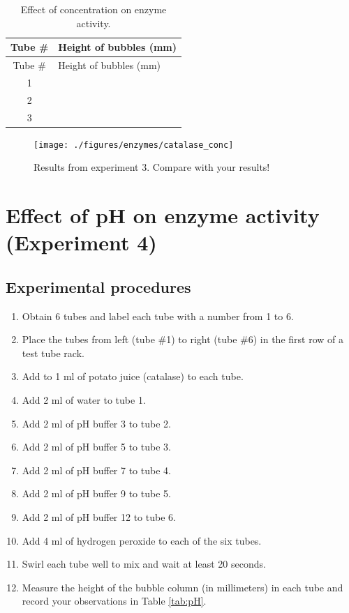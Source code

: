 \documentclass[]{book}
\providecommand{\tightlist}{%
  \setlength{\itemsep}{0pt}\setlength{\parskip}{0pt}}
\theoremstyle{definition}
\theoremstyle{definition}
\theoremstyle{definition}
\theoremstyle{remark}
\begin{document}
\begin{longtable}[]{@{}cl@{}}
\caption{\label{tab:concentration} Effect of concentration on enzyme
activity.}\tabularnewline
\toprule
Tube \# & Height of bubbles (mm)\tabularnewline
\midrule
\endfirsthead
\toprule
Tube \# & Height of bubbles (mm)\tabularnewline
\midrule
\endhead
1 &\tabularnewline
2 &\tabularnewline
3 &\tabularnewline
\bottomrule
\end{longtable}

\begin{figure}

{\centering \texttt{[image: ./figures/enzymes/catalase\_conc]} 

}

\caption{Results from experiment 3. Compare with your results!}\label{fig:conc}
\end{figure}

\section{Effect of pH on enzyme activity (Experiment
4)}\label{effect-of-ph-on-enzyme-activity-experiment-4}

\subsection{Experimental procedures}\label{experimental-procedures-23}

\begin{enumerate}
\def\labelenumi{\arabic{enumi}.}
\tightlist
\item
  Obtain 6 tubes and label each tube with a number from 1 to 6.
\item
  Place the tubes from left (tube \#1) to right (tube \#6) in the first
  row of a test tube rack.
\item
  Add to 1 ml of potato juice (catalase) to each tube.
\item
  Add 2 ml of water to tube 1.
\item
  Add 2 ml of pH buffer 3 to tube 2.
\item
  Add 2 ml of pH buffer 5 to tube 3.
\item
  Add 2 ml of pH buffer 7 to tube 4.
\item
  Add 2 ml of pH buffer 9 to tube 5.
\item
  Add 2 ml of pH buffer 12 to tube 6.
\item
  Add 4 ml of hydrogen peroxide to each of the six tubes.
\item
  Swirl each tube well to mix and wait at least 20 seconds.
\item
  Measure the height of the bubble column (in millimeters) in each tube
  and record your observations in Table \ref{tab:pH}.
\end{enumerate}
\end{document}
